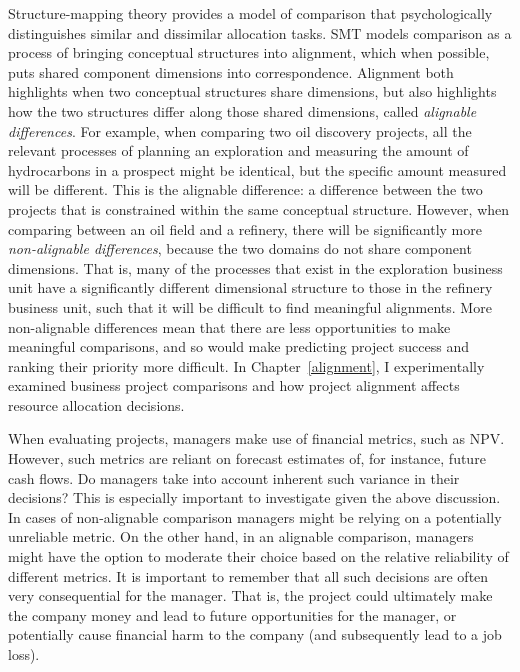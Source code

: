 \documentclass[a4paper, nobind, dvipsnames]{templates/ociamthesis}
\theoremstyle{definition}
\theoremstyle{definition}
\theoremstyle{definition}
\theoremstyle{definition}
\theoremstyle{remark}
\begin{document}
Structure-mapping theory \autocites[SMT;][]{gentner1997,gentner1983} provides a model of
comparison that psychologically distinguishes similar and dissimilar allocation
tasks. SMT models comparison as a process of bringing conceptual structures into
alignment, which when possible, puts shared component dimensions into
correspondence. Alignment both highlights when two conceptual structures share
dimensions, but also highlights how the two structures differ along those shared
dimensions, called \emph{alignable differences}. For example, when comparing two oil
discovery projects, all the relevant processes of planning an exploration and
measuring the amount of hydrocarbons in a prospect might be identical, but the
specific amount measured will be different. This is the alignable difference: a
difference between the two projects that is constrained within the same
conceptual structure. However, when comparing between an oil field and a
refinery, there will be significantly more \emph{non-alignable differences}, because
the two domains do not share component dimensions. That is, many of the
processes that exist in the exploration business unit have a significantly
different dimensional structure to those in the refinery business unit, such
that it will be difficult to find meaningful alignments. More non-alignable
differences mean that there are less opportunities to make meaningful
comparisons, and so would make predicting project success and ranking their
priority more difficult. In Chapter~\ref{alignment}, I experimentally examined
business project comparisons and how project alignment affects resource
allocation decisions.

When evaluating projects, managers make use of financial metrics, such as NPV.
However, such metrics are reliant on forecast estimates of, for instance, future
cash flows. Do managers take into account inherent such variance in their
decisions? This is especially important to investigate given the above
discussion. In cases of non-alignable comparison managers might be relying on a
potentially unreliable metric. On the other hand, in an alignable comparison,
managers might have the option to moderate their choice based on the relative
reliability of different metrics. It is important to remember that all such
decisions are often very consequential for the manager. That is, the project
could ultimately make the company money and lead to future opportunities for the
manager, or potentially cause financial harm to the company (and subsequently
lead to a job loss).
\end{document}
